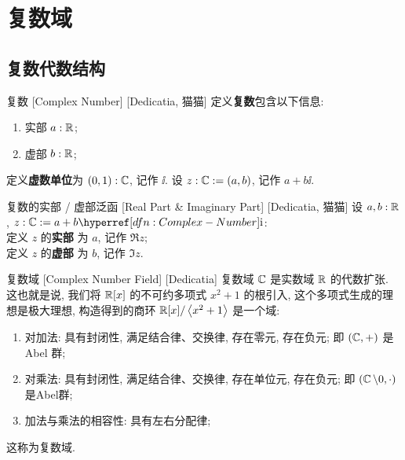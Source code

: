 \section{复数域}

    \subsection{复数代数结构}

        \begin{dfn}
            {复数}
            [Complex Number]
            [Dedicatia, 猫猫]
            定义\textbf{复数}包含以下信息: 
            \begin{enumerate}
                \item 实部 \(a:\operatorname{\mathbb{R}}\); 
                \item 虚部 \(b:\operatorname{\mathbb{R}}\); 
            \end{enumerate}
            定义\textbf{虚数单位}为 \((0,1):\operatorname{\mathbb{C}}\), 记作 \(\ii\). 设 \(z:\operatorname{\mathbb{C}}:=(a,b)\), 记作 \(a+b\ii\). 
        \end{dfn}
        
        \begin{dfn}
            [Re-Im]
            {复数的实部 / 虚部泛函}
            [Real Part \& Imaginary Part]
            [Dedicatia, 猫猫]
            设 \(a,b:\operatorname{\mathbb{R}}\), \(z:\C:=a+b\ii\):\\
            定义 \(z\) 的\textbf{实部} 为 \(a\), 记作 \(\Re z\); \\
            定义 \(z\) 的\textbf{虚部} 为 \(b\), 记作 \(\Im z\). 
        \end{dfn}
        
        \begin{dfn}
            {复数域}
            [Complex Number Field]
            [Dedicatia]
            复数域 \(\operatorname{\mathbb{C}}\) 是实数域 \(\operatorname{\mathbb{R}}\) 的代数扩张. 这也就是说, 我们将 \(\operatorname{\mathbb{R}}[x]\) 的不可约多项式 \(x^2+1\) 的根引入, 这个多项式生成的理想是极大理想, 构造得到的商环 \(\operatorname{\mathbb{R}}[x]/\left\langle x^2+1\right\rangle\) 是一个域: 
            \begin{enumerate}
                \item 对加法: 具有封闭性, 满足结合律、交换律, 存在零元, 存在负元; 即 \((\operatorname{\mathbb{C}},+)\) 是 Abel 群; 
                \item 对乘法: 具有封闭性, 满足结合律、交换律, 存在单位元, 存在负元; 即 \((\operatorname{\mathbb{C}}\setminus 0,\cdot)\) 是Abel群; 
                \item 加法与乘法的相容性: 具有左右分配律; 
            \end{enumerate}
            这称为复数域. 
        \end{dfn}
        
